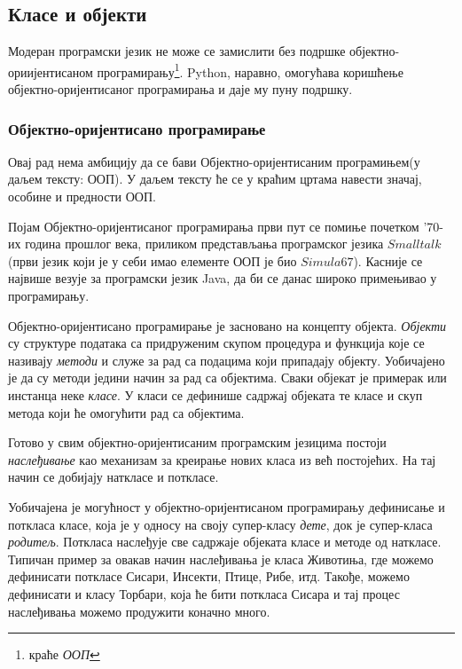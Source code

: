 \subsection{Класе и објекти}

Модеран програмски језик не може се замислити без подршке објектно-ориијентисаном програмирању\footnote{краће \emph{ООП}}. Python, наравно, омогућава коришћење објектно-оријентисаног програмирања и даје му пуну подршку.

\subsubsection{Објектно-оријентисано програмирање}

Овај рад нема амбицију да се бави Објектно-оријентисаним програмињем(у даљем тексту: ООП). У даљем тексту ће се у краћим цртама навести значај, особине и предности ООП.

Појам Објектно-оријентисаног програмирања први пут се помиње почетком '70-их година прошлог века, приликом представљања програмског језика $Smalltalk$ (први језик који је у себи имао елементе ООП је био $Simula67$). Касније се највише везује за програмски језик Java, да би се данас широко примењивао у програмирању.

Објектно-оријентисано програмирање је засновано на концепту објекта. \emph{Објекти} су структуре података са придруженим скупом процедура и функција које се називају \emph{методи} и служе за рад са подацима који припадају објекту. Уобичајено је да су методи једини начин за рад са објектима. Сваки објекат је примерак или инстанца неке \emph{класе}. У класи се дефинише садржај објеката те класе и скуп метода који ће омогућити рад са објектима.

Готово у свим објектно-оријентисаним програмским језицима постоји \emph{наслеђивање} као механизам за креирање нових класа из већ постојећих. На тај начин се добијају наткласе и поткласе.

Уобичајена је могућност у објектно-оријентисаном програмирању дефинисање и поткласа класе, која је у односу на своју супер-класу \emph{дете}, док је супер-класа \emph{родитељ}. Поткласа наслеђује све садржаје објеката класе и методе од наткласе. Типичан пример за овакав начин наслеђивања је класа Животиња, где можемо дефинисати поткласе Сисари, Инсекти, Птице, Рибе, итд. Такође, можемо дефинисати и класу Торбари, која ће бити поткласа Сисара и тај процес наслеђивања можемо продужити коначно много.

